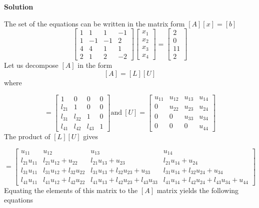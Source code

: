 \documentclass[a4paper, 12pt]{report}
\begin{document}
{\begin{center}
	\textbf{Solution}
\end{center}
 The set of the equations can be written in the matrix form $[A][x]=[b]$
\begin{equation*}
\begin{bmatrix}
1& 1& 1& -1\\
1& -1& -1& 2\\
4& 4& 1& 1\\
2& 1& 2& -2
\end{bmatrix}
\begin{bmatrix}
x_1\\ x_2\\ x_3\\ x_4
\end{bmatrix}
=
\begin{bmatrix}
2\\ 0\\ 11\\ 2
\end{bmatrix}
\end{equation*}
Let us decompose $[A]$ in the form $$[A]=[L][U]$$
where

\begin{equation*}
[L]=
\begin{bmatrix}
1& 0& 0& 0\\
l_{21}& 1& 0& 0\\
l_{31}& l_{32}& 1& 0\\
l_{41}& l_{42}& l_{43}& 1
\end{bmatrix}
\text{and}\ [U]=
\begin{bmatrix}
u_{11}& u_{12}& u_{13}& u_{14}\\
0& u_{22}& u_{23}& u_{24}\\
0& 0& u_{33}& u_{34}\\
0& 0& 0& u_{44}
\end{bmatrix}
\end{equation*}
The product of $[L][U]$ gives

\begin{equation*}
[L][U]=
\begin{bmatrix}
u_{11}& u_{12}& u_{13}& u_{14}\\
l_{21}u_{11}& l_{21}u_{12}+u_{22}& l_{21}u_{13}+u_{23}& l_{21}u_{14}+u_{24}\\
l_{31}u_{11}& l_{31}u_{12}+l_{32}u_{22}& l_{31}u_{13}+l_{32}u_{23}+u_{33}& l_{31}u_{14}+l_{32}u_{24}+u_{34}\\
l_{41}u_{11}& l_{41}u_{12}+l_{42}u_{22}& l_{41}u_{13}+l_{42}u_{23}+l_{43}u_{33}& l_{41}u_{14}+l_{42}u_{24}+l_{43}u_{34}+u_{44}
\end{bmatrix}
\end{equation*}
Equating the elements of this matrix to the $[A]$ matrix yields the following equations

}
\end{document}
